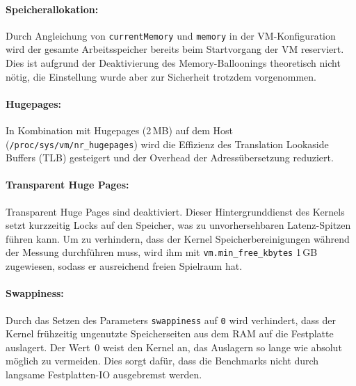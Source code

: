 \begin{sloppypar}
\paragraph{Speicherallokation:}
Durch Angleichung von \texttt{currentMemory} und \texttt{memory} in der \acs{VM}-Konfiguration
wird der gesamte Arbeitsspeicher bereits beim Startvorgang der \acs{VM} reserviert.
Dies ist aufgrund der Deaktivierung des Memory-Balloonings theoretisch nicht nötig,
die Einstellung wurde aber zur Sicherheit trotzdem vorgenommen. \cite{4:redhat}

\paragraph{Hugepages:}
In Kombination mit Hugepages (2\,MB) auf dem Host (\texttt{/proc/sys/vm/nr\_hugepages})
wird die Effizienz des Translation Lookaside Buffers (\acs{TLB}) gesteigert
und der Overhead der Adressübersetzung reduziert. \cite{3:debian, 10:Ban}

\paragraph{Transparent Huge Pages:}
Transparent Huge Pages sind deaktiviert.
Dieser Hintergrunddienst des Kernels setzt kurzzeitig Locks auf den Speicher,
was zu unvorhersehbaren Latenz-Spitzen führen kann.
Um zu verhindern, dass der Kernel Speicherbereinigungen während der Messung durchführen muss,
wird ihm mit \texttt{vm.min\_free\_kbytes} 1\,GB zugewiesen,
sodass er ausreichend freien Spielraum hat. \cite{1:Scalability, 10:Ban}

\paragraph{Swappiness:}
Durch das Setzen des Parameters \texttt{swappiness} auf \texttt{0} wird verhindert,
dass der Kernel frühzeitig ungenutzte Speicherseiten aus dem \acs{RAM} auf die Festplatte auslagert.
Der Wert~0 weist den Kernel an, das Auslagern so lange wie absolut möglich zu vermeiden.
Dies sorgt dafür, dass die Benchmarks nicht durch langsame Festplatten-\acs{IO} ausgebremst werden. \cite{1:Scalability}



\end{sloppypar}
